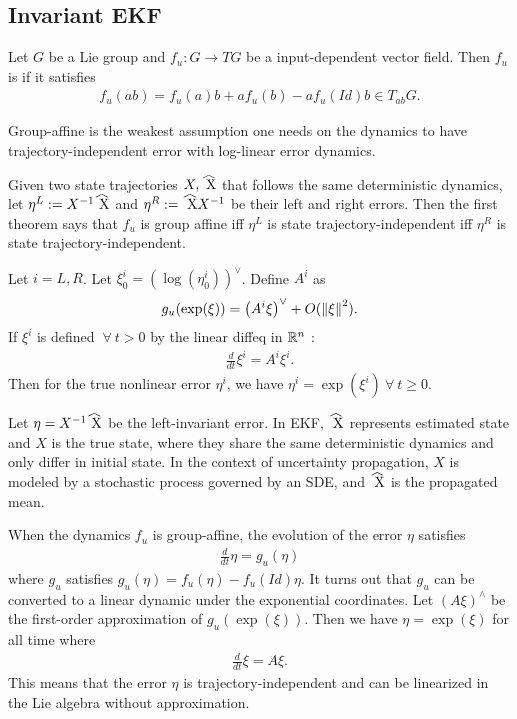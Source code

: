 \documentclass[12pt,class=article,crop=false]{standalone}
\begin{document}
\subsection{Invariant EKF}

\begin{defn}
Let $ G$ be a Lie group and $ f_u: G \to TG$ be a input-dependent vector field. Then $ f_u$ is   if it satisfies 
\begin{align*}
	f_u(ab) = f_u(a) b + a f_u(b) - a f_u( Id) b  \in T_{ab}G.
\end{align*}
\end{defn}
Group-affine is the weakest assumption one needs on the dynamics to have trajectory-independent error with log-linear error dynamics.

Given two state trajectories $ X,\wh{ X}$ that follows the same deterministic dynamics, let $ \eta^{L} := X^{-1}\wh{ X}$ and $ \eta^R := \wh{ X} X^{-1} $ be their left and right errors. Then the first theorem says that $ f_u$ is group affine iff $ \eta^L$ is state trajectory-independent iff $ \eta^R$ is state trajectory-independent.

\begin{thm}
Let $ i=L,R$. Let  $ \xi^i_0 = (\log(\eta_0^{i}))^\vee$. Define $ A^{i}$ as
\begin{align*}
	g_u( \exp( \xi)) = \left( A^{i} \xi \right)^\vee + O({\left\lVert{ \xi}\right\rVert}^2). 
\end{align*}
If $ \xi^{i}$ is defined $ \ \forall \ t>0$ by the linear diffeq in $ \mathbb{R}^{n}$ :
\begin{align*}
	\frac{d}{dt} \xi^{i} = A^{i} \xi^{i} .
\end{align*}
Then for the true nonlinear error $ \eta^{i}$, we have $ \eta^{i} = \exp( \xi^{i}) \ \forall \ t \geq 0$.
\end{thm}

Let $ \eta = X^{-1} \wh{ X} $ be the left-invariant error. In EKF, $ \wh{ X}$ represents estimated state and $ X$ is the true state, where they share the same deterministic dynamics and only differ in initial state. In the context of uncertainty propagation, $ X$ is modeled by a stochastic process governed by an SDE, and $ \wh{ X}$ is the propagated mean.

When the dynamics $ f_u$ is group-affine, the evolution of the error $ \eta$ satisfies
\begin{align*}
	\frac{d}{dt} \eta = g_u (\eta)
\end{align*}
where $ g_u$ satisfies $ g_u(\eta) = f_u(\eta) - f_u( Id) \eta$. It turns out that $ g_u$ can be converted to a linear dynamic under the exponential coordinates. Let  $ (A \xi) ^\wedge$ be the first-order approximation of  $ g_u (\exp (\xi))$. Then we have $ \eta = \exp( \xi)$ for all time where
\begin{align*}
	\frac{d}{dt} \xi = A \xi .
\end{align*}
This means that the error $ \eta$ is trajectory-independent and can be linearized in the Lie algebra without approximation. 
\end{document}
